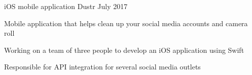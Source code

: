 \begin{cventries}
  \cventry
    {iOS mobile application}
    {Dustr}
    {July 2017}
    {}
    {
      \begin{cvitems}
       \item {Mobile application that helps clean up your social media accounts and camera roll}
        \item {Working on a team of three people to develop an iOS application using Swift}
        \item {Responsible for API integration for several social media outlets}
      \end{cvitems}
    }
 \end{cventries}
